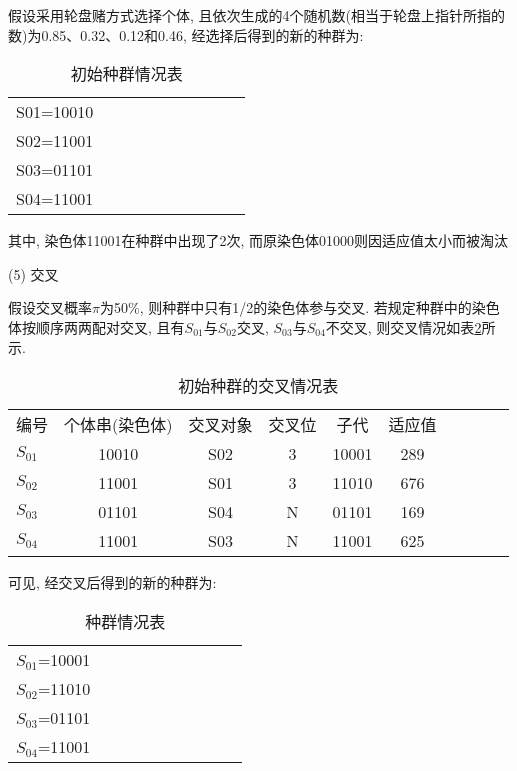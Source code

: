 {假设采用轮盘赌方式选择个体, 且依次生成的4个随机数(相当于轮盘上指针所指的数)为0.85、0.32、0.12和0.46, 经选择后得到的新的种群为:
\begin{table} [H]
\caption{初始种群情况表}
\begin{center}
\begin{tabular} {lccccccccc}
\hline
    S01=10010\\
    S02=11001\\
    S03=01101\\
    S04=11001\\
\hline
\end{tabular}
\end{center}
\label{AI_table2019112803}
\end{table}
其中, 染色体11001在种群中出现了2次, 而原染色体01000则因适应值太小而被淘汰

(5) 交叉

假设交叉概率$\pi$为50\%, 则种群中只有1/2的染色体参与交叉. 若规定种群中的染色体按顺序两两配对交叉, 且有$S_{01}$与$S_{02}$交叉, $S_{03}$与$S_{04}$不交叉, 则交叉情况如表\ref{AI_table2019112804}所示.

\begin{table} [H]
\caption{初始种群的交叉情况表}
\begin{center}
\begin{tabular} {lccccccccc}
  \hline
编号&	个体串(染色体)&	交叉对象	&交叉位&	  子代	& 适应值\\
$S_{01}$	&10010&	S02&	3	&10001	&289\\
$S_{02}$	&11001&	S01&	3	&11010	&676\\
$S_{03}$	&01101&	S04&	N	&01101	&169\\
$S_{04}$	&11001&	S03&	N	&11001	&625\\
\hline
\end{tabular}
\end{center}
\label{AI_table2019112804}
\end{table}

可见, 经交叉后得到的新的种群为:
\begin{table} [H]
\caption{种群情况表}
\begin{center}
\begin{tabular} {lccccccccc}
\hline
    $S_{01}$=10001\\
    $S_{02}$=11010\\
    $S_{03}$=01101\\
    $S_{04}$=11001\\
\hline
\end{tabular}
\end{center}
\end{table}

}
